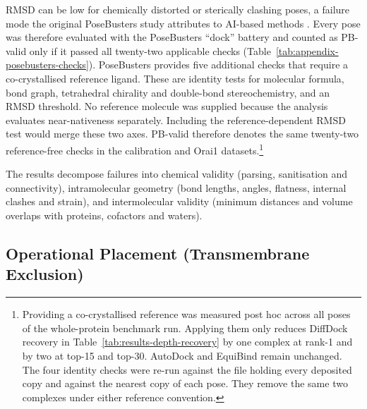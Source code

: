 RMSD can be low for chemically distorted or sterically clashing poses, a failure mode the original PoseBusters study attributes to AI-based methods \cite{ref035}. Every pose was therefore evaluated with the PoseBusters ``dock'' battery and counted as PB-valid only if it passed all twenty-two applicable checks (Table~\ref{tab:appendix-posebusters-checks}). PoseBusters provides five additional checks that require a co-crystallised reference ligand. These are identity tests for molecular formula, bond graph, tetrahedral chirality and double-bond stereochemistry, and an RMSD threshold. No reference molecule was supplied because the analysis evaluates near-nativeness separately. Including the reference-dependent RMSD test would merge these two axes. PB-valid therefore denotes the same twenty-two reference-free checks in the calibration and Orai1 datasets.\footnote{Providing a co-crystallised reference was measured post hoc across all poses of the whole-protein benchmark run. Applying them only reduces DiffDock recovery in Table~\ref{tab:results-depth-recovery} by one complex at rank-1 and by two at top-15 and top-30. AutoDock and EquiBind remain unchanged. The four identity checks were re-run against the file holding every deposited copy and against the nearest copy of each pose. They remove the same two complexes under either reference convention.}

The results decompose failures into chemical validity (parsing, sanitisation and connectivity), intramolecular geometry (bond lengths, angles, flatness, internal clashes and strain), and intermolecular validity (minimum distances and volume overlaps with proteins, cofactors and waters). 


\hypertarget{operational-placement-transmembrane-exclusion}{%
\subsection{Operational Placement (Transmembrane Exclusion)}\label{operational-placement-transmembrane-exclusion}}

